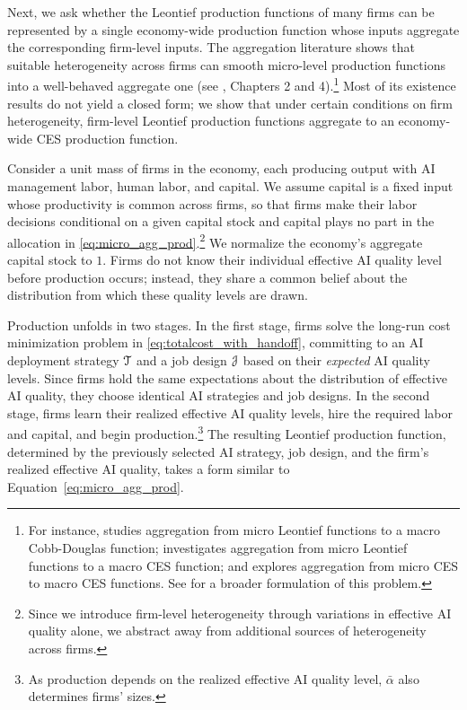Next, we ask whether the Leontief production functions of many firms can be represented by a single economy-wide production function whose inputs aggregate the corresponding firm-level inputs.
The aggregation literature shows that suitable heterogeneity across firms can smooth micro-level production functions into a well-behaved aggregate one (see \cite{sato1975production}, Chapters 2 and 4).\footnote{
For instance, \cite{houthakker1955pareto} studies aggregation from micro Leontief functions to a macro Cobb-Douglas function; \cite{levhari1968note} investigates aggregation from micro Leontief functions to a macro CES function; and \cite{sato1969micro} explores aggregation from micro CES to macro CES functions. 
See \cite{baqaee2019foundations} for a broader formulation of this problem.}
Most of its existence results do not yield a closed form; we show that under certain conditions on firm heterogeneity, firm-level Leontief production functions aggregate to an economy-wide CES production function.

Consider a unit mass of firms in the economy, each producing output with AI management labor, human labor, and capital.
We assume capital is a fixed input whose productivity is common across firms, so that firms make their labor decisions conditional on a given capital stock and capital plays no part in the allocation in \eqref{eq:micro_agg_prod}.\footnote{Since we introduce firm-level heterogeneity through variations in effective AI quality alone, we abstract away from additional sources of heterogeneity across firms.}
We normalize the economy's aggregate capital stock to $1$.
Firms do not know their individual effective AI quality level before production occurs; instead, they share a common belief about the distribution from which these quality levels are drawn.

Production unfolds in two stages.
In the first stage, firms solve the long-run cost minimization problem in \eqref{eq:totalcost_with_handoff}, committing to an AI deployment strategy $\mathcal{T}$ and a job design $\mathcal{J}$ based on their \emph{expected} AI quality levels.
Since firms hold the same expectations about the distribution of effective AI quality, they choose identical AI strategies and job designs.
In the second stage, firms learn their realized effective AI quality levels, hire the required labor and capital, and begin production.\footnote{As production depends on the realized effective AI quality level, $\bar{\alpha}$ also determines firms' sizes.}
The resulting Leontief production function, determined by the previously selected AI strategy, job design, and the firm's realized effective AI quality, takes a form similar to Equation~\eqref{eq:micro_agg_prod}.

